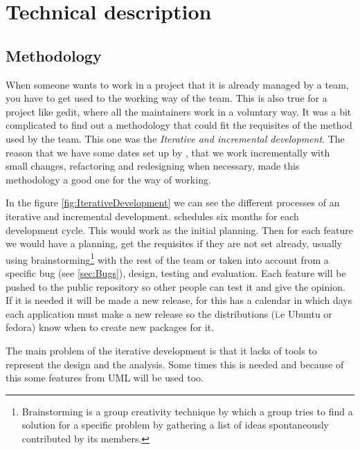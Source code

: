 
\chapter{Technical description}


\section{Methodology}\label{sec:Methodology}

When someone wants to work in a project that it is already managed by a team, you have to get used to the working way of the team. This is also true for a project like gedit, where all the maintainers work in a voluntary way. It was a bit complicated to find out a methodology that could fit the requisites of the method used by the team. This one was the \emph{Iterative and incremental development}. The reason that we have some dates set up by \GNOME, that we work incrementally with small changes, refactoring and redesigning when necessary, made this methodology a good one for the way of working.



In the figure \ref{fig:IterativeDevelopment} we can see the different processes of an iterative and incremental development. \GNOME schedules six months for each development cycle. This would work as the initial planning. Then for each feature we would have a planning, get the requisites if they are not set already, usually using brainstorming\footnote{Brainstorming is a group creativity technique by which a group tries to find a solution for a specific problem by gathering a list of ideas spontaneously contributed by its members.} with the rest of the team or taken into account from a specific bug (see \ref{sec:Bugs}), design, testing and evaluation. Each feature will be pushed to the public repository so other people can test it and give the opinion. If it is needed it will be made a new release, for this \GNOME has a calendar in which days each application must make a new release so the distributions (i.e Ubuntu or fedora) know when to create new packages for it.

The main problem of the iterative development is that it lacks of tools to represent the design and the analysis. Some times this is needed and because of this some features from UML will be used too.

